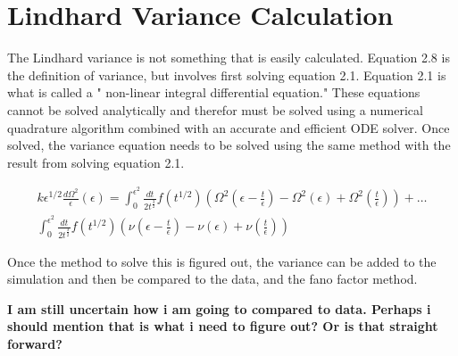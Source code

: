 \section{Lindhard Variance Calculation}
The Lindhard variance is not something that is easily calculated. Equation 2.8 is the definition of variance, but involves first solving equation 2.1. Equation 2.1 is what is called a " non-linear integral differential equation." These equations cannot be solved analytically and therefor must be solved using a numerical quadrature algorithm combined with an accurate and efficient ODE solver. \cite{IDEQ} Once solved, the variance equation needs to be solved using the same method with the result from solving equation 2.1.

\begin{equation}
\begin{gathered}
k \epsilon^{1/2}\frac{d\Omega^2}{\epsilon}(\epsilon) = \int_{0}^{\epsilon^{2}} \frac{dt}{2t^{\frac{3}{2}}}f(t^{1/2})(\Omega^2(\epsilon -\frac{t}{\epsilon}) - \Omega^2(\epsilon) +\Omega^2(\frac{t}{\epsilon})) +\dots\\
\int_{0}^{\epsilon^{2}} \frac{dt}{2t^{\frac{3}{2}}}f(t^{1/2})(\nu(\epsilon -\frac{t}{\epsilon}) - \nu(\epsilon)+\nu(\frac{t}{\epsilon}))
\end{gathered}
\end{equation}

\noindent
Once the method to solve this is figured out, the variance can be added to the simulation and then be compared to the data, and the fano factor method. 

\noindent
\textbf{I am still uncertain how i am going to compared to data. Perhaps i should mention that is what i need to figure out? Or is that straight forward? }